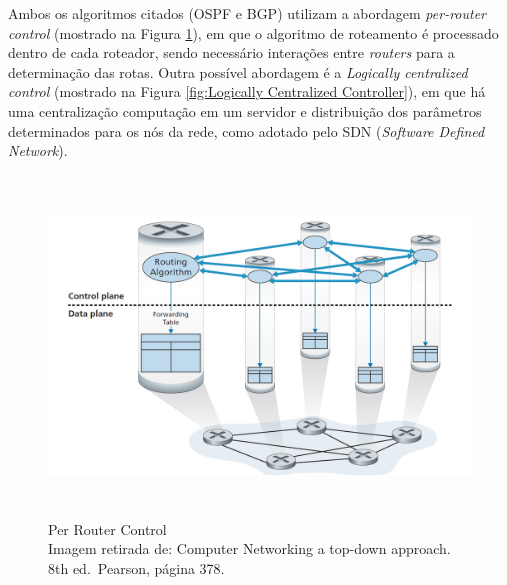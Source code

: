 Ambos os algoritmos citados (OSPF e BGP) utilizam a abordagem
\emph{per-router control} (mostrado na Figura \ref{fig:Per Router Control}), em que o algoritmo de
roteamento é processado dentro de cada roteador, sendo necessário
interações entre \emph{routers} para a determinação das rotas. Outra
possível abordagem é a \emph{Logically centralized control} (mostrado na
Figura \ref{fig:Logically Centralized Controller}), em que há uma centralização computação em um servidor e
distribuição dos parâmetros determinados para os nós da rede, como
adotado pelo SDN (\emph{Software Defined Network}).


\begin{figure}[h!]
\centering
\includegraphics[keepaspectratio, width=12cm, height=9cm]{imagens/14/14 - per router control.png}
\caption{Per Router Control \\
Imagem retirada de: Computer Networking a top-down approach. 8th
ed.~Pearson, página 378. \\}
\label{fig:Per Router Control}
\end{figure}



